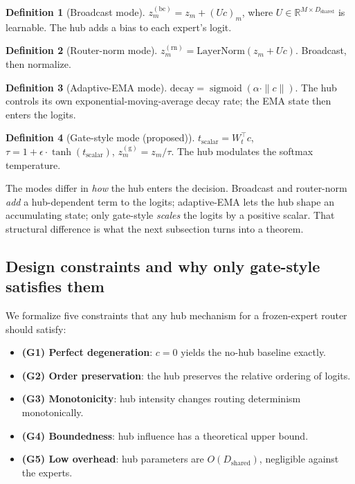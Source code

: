 \documentclass[10pt,twoside]{article}
\newcommand{\sigmoid}{\operatorname{sigmoid}}
\newcommand{\R}{\mathbb{R}}
\theoremstyle{definition}
\newtheorem{definition}{Definition}[section]
\theoremstyle{plain}
\theoremstyle{remark}
\begin{document}
\begin{definition}[Broadcast mode]
$z_m^{(\text{bc})} = z_m + (U c)_m$, where $U \in \R^{M \times D_{\text{shared}}}$ is learnable. The hub adds a bias to each expert's logit.
\end{definition}

\begin{definition}[Router-norm mode]
$z_m^{(\text{rn})} = \mathrm{LayerNorm}(z_m + U c)$. Broadcast, then normalize.
\end{definition}

\begin{definition}[Adaptive-EMA mode]
$\text{decay} = \sigmoid(\alpha \cdot \|c\|)$. The hub controls its own exponential-moving-average decay rate; the EMA state then enters the logits.
\end{definition}

\begin{definition}[Gate-style mode (proposed)]
$t_{\text{scalar}} = W_t^\top c$, $\tau = 1 + \epsilon \cdot \tanh(t_{\text{scalar}})$, $z_m^{(\text{g})} = z_m / \tau$. The hub modulates the softmax temperature.
\end{definition}

The modes differ in \emph{how} the hub enters the decision. Broadcast and router-norm \emph{add} a hub-dependent term to the logits; adaptive-EMA lets the hub shape an accumulating state; only gate-style \emph{scales} the logits by a positive scalar. That structural difference is what the next subsection turns into a theorem.

\subsection{Design constraints and why only gate-style satisfies them}
\label{sec:theory}

We formalize five constraints that any hub mechanism for a frozen-expert router should satisfy:
\begin{itemize}[leftmargin=1.5em, itemsep=1pt]
    \item \textbf{(G1) Perfect degeneration}: $c=0$ yields the no-hub baseline exactly.
    \item \textbf{(G2) Order preservation}: the hub preserves the relative ordering of logits.
    \item \textbf{(G3) Monotonicity}: hub intensity changes routing determinism monotonically.
    \item \textbf{(G4) Boundedness}: hub influence has a theoretical upper bound.
    \item \textbf{(G5) Low overhead}: hub parameters are $O(D_{\text{shared}})$, negligible against the experts.
\end{itemize}
\end{document}
